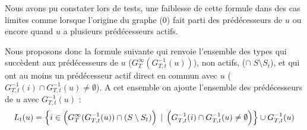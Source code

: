 	Nous avons pu constater lors de tests, une faiblesse de cette formule dans des cas limites comme lorsque l'origine du graphe (0) fait parti des prédécesseurs de $u$ ou encore quand $u$ a plusieurs prédécesseurs actifs.%


	
% 

	Nous proposons donc la formule suivante qui renvoie l'ensemble des types qui succèdent aux prédécesseurs de $u$ ($G_T^{\infty}(G_{T,t}^{-1} (u))$), non actifs, ($\cap\; S \setminus S_t$), et qui ont au moins un prédécesseur actif direct en commun avec $u$ ($G_{T,t}^{-1} (i) \cap G_{T,t}^{-1} (u) \neq \emptyset$). A cet ensemble on ajoute l'ensemble des prédécesseurs de $u$ avec $G_{T,t}^{-1}(u)$ :
	\begin{equation}
 	  L_t(u) = \left\{ i \in \left( G_T^{\infty}(G_{T,t}^{-1} (u)) \cap ( S \setminus S_t ) \right) \;|\; \left( G_{T,t}^{-1} (i) \cap G_{T,t}^{-1} (u) \neq \emptyset \right) \right\} \cup  G_{T,t}^{-1}(u)\\
	\end{equation}


